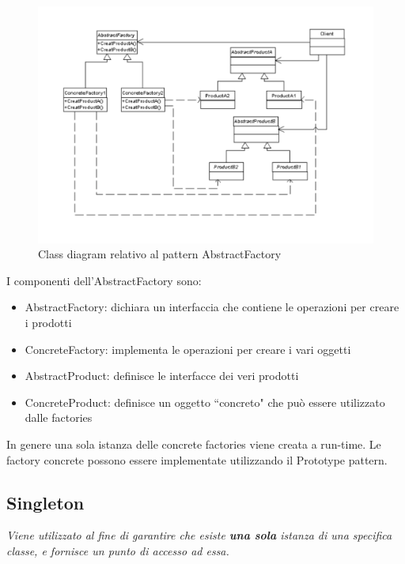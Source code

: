 \documentclass{article}
\begin{document}
\begin{figure}[h]
\centering
\includegraphics[width=1\textwidth]{Img/AbstractFactoryDescription.pdf}
\caption{Class diagram relativo al pattern AbstractFactory}
\label{Fig:AbstractFactoryDescription}
\end{figure}

I componenti dell'AbstractFactory sono:
\begin{itemize}
\item AbstractFactory: dichiara un interfaccia che contiene le operazioni per creare i prodotti
\item ConcreteFactory: implementa le operazioni per creare i vari oggetti
\item AbstractProduct: definisce le interfacce dei veri prodotti
\item ConcreteProduct: definisce un oggetto ``concreto" che pu\`o essere utilizzato dalle factories
\end{itemize}

In genere una sola istanza delle concrete factories viene creata a run-time. Le factory concrete possono essere implementate utilizzando il Prototype pattern.





\subsection{Singleton}
\begin{framed}
\emph{Viene utilizzato al fine di garantire che esiste \textbf{una sola} istanza di una specifica classe, e fornisce un punto di accesso ad essa.}
\end{framed}
\end{document}
